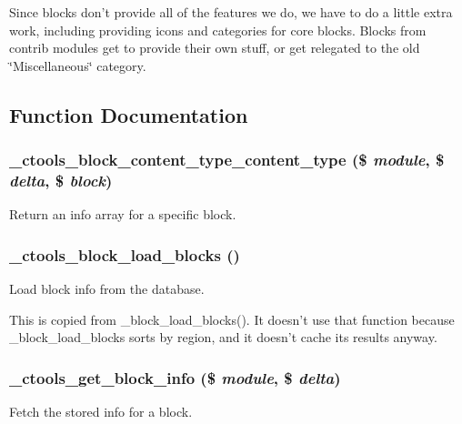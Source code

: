 Since blocks don't provide all of the features we do, we have to do a little extra work, including providing icons and categories for core blocks. Blocks from contrib modules get to provide their own stuff, or get relegated to the old \char`\"{}Miscellaneous\char`\"{} category. 

\subsection{Function Documentation}
\hypertarget{block_8inc_a28496d861d9c2b82fe8288a30ba97312}{
\subsubsection[{\_\-ctools\_\-block\_\-content\_\-type\_\-content\_\-type}]{\setlength{\rightskip}{0pt plus 5cm}\_\-ctools\_\-block\_\-content\_\-type\_\-content\_\-type (\$ {\em module}, \/  \$ {\em delta}, \/  \$ {\em block})}}
\label{block_8inc_a28496d861d9c2b82fe8288a30ba97312}
Return an info array for a specific block. \hypertarget{block_8inc_ab02ec538c54a12376c3704ec2b6cddb8}{
\subsubsection[{\_\-ctools\_\-block\_\-load\_\-blocks}]{\setlength{\rightskip}{0pt plus 5cm}\_\-ctools\_\-block\_\-load\_\-blocks ()}}
\label{block_8inc_ab02ec538c54a12376c3704ec2b6cddb8}
Load block info from the database.

This is copied from \_\-block\_\-load\_\-blocks(). It doesn't use that function because \_\-block\_\-load\_\-blocks sorts by region, and it doesn't cache its results anyway. \hypertarget{block_8inc_a07ccb689401785f6c61bfde2d35ec58c}{
\subsubsection[{\_\-ctools\_\-get\_\-block\_\-info}]{\setlength{\rightskip}{0pt plus 5cm}\_\-ctools\_\-get\_\-block\_\-info (\$ {\em module}, \/  \$ {\em delta})}}
\label{block_8inc_a07ccb689401785f6c61bfde2d35ec58c}
Fetch the stored info for a block.

